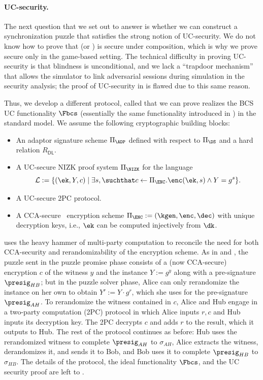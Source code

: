\paragraph{UC-security.} The next question that we set out to answer is whether we can construct a synchronization puzzle that satisfies the strong notion of UC-security. We do not know how to prove that \AAL (or \AALplus) is secure under composition, which is why we prove \AALplus secure only in the game-based setting. The technical difficulty in proving UC-security is that blindness is unconditional, and we lack a ``trapdoor mechanism'' that allows the simulator to link adversarial sessions during simulation in the security analysis; the proof of UC-security in \cite{SP:TaiMorMaf21} is flawed due to this same reason. 

Thus, we develop a different protocol, called \AALUC %
that we can prove realizes the BCS UC functionality $\Fbcs$ (essentially the same functionality introduced in \cite{SP:TaiMorMaf21}) in the standard model. We assume the following cryptographic building blocks:
\begin{itemize}
    \item An adaptor signature scheme $\Pi_\ADP$ defined with respect to $\Pi_\DS$ and a hard relation $R_\mathsf{DL}$.
    \item A UC-secure NIZK proof system $\Pi_\NIZK$ for the language $$\mathcal{L} := \{ (\ek, Y,c) \mid \exists s, \suchthat c \gets \Pi_\ENC.\enc(\ek, s) \land Y = g^s \}. $$ 
    \item A UC-secure 2PC protocol.
    \item A CCA-secure~\cite{FOCS:BDJR97} encryption scheme $\Pi_\ENC := (\kgen, \enc, \dec)$ with unique decryption keys, i.e., $\ek$ can be computed injectively from $\dk$.
\end{itemize}

\AALUC uses the heavy hammer of multi-party computation to reconcile the need for both CCA-security and rerandomizability of the encryption scheme. As in \AAL and \AALplus, the puzzle sent in the puzzle promise phase consists of a (now CCA-secure) encryption $c$ of the witness $y$ and the instance $Y := g^y$ along with a pre-signature $\presig_{HB}$; but in the puzzle solver phase, Alice can only rerandomize the instance on her own to obtain $Y' := Y \cdot g^r$, which she uses for the pre-signature $\presig_{AH}$. To rerandomize the witness contained in $c$, Alice and Hub engage in a two-party computation (2PC) protocol in which Alice inputs $r, c$ and Hub inputs its decryption key. The 2PC decrypts $c$ and adds $r$ to the result, which it outputs to Hub. The rest of the protocol continues as before: Hub uses the rerandomized witness to complete $\presig_{AH}$ to $\sigma_{AH}$, Alice extracts the witness, derandomizes it, and sends it to Bob, and Bob uses it to complete $\presig_{HB}$ to $\sigma_{HB}$. The details of the protocol, the ideal functionality $\Fbcs$, and the UC security proof are left to \cite{CCS:GMMMTT22}.

